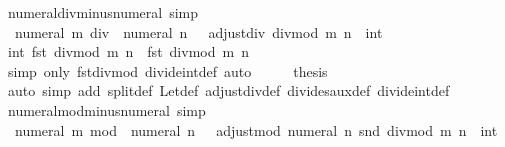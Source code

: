 \begin{isabellebody}
\isamarkupfalse%
%
\endisatagproof
{\isafoldproof}%
%
\isadelimproof
\isanewline
%
\endisadelimproof
\isanewline
{}\isamarkupfalse%
\ numeral{\isacharunderscore}{\kern0pt}div{\isacharunderscore}{\kern0pt}minus{\isacharunderscore}{\kern0pt}numeral\ {\isacharbrackleft}{\kern0pt}simp{\isacharbrackright}{\kern0pt}{\isacharcolon}{\kern0pt}\isanewline
\ \ {\isachardoublequoteopen}numeral\ m\ div\ {\isacharminus}{\kern0pt}\ numeral\ n\ {\isacharequal}{\kern0pt}\ {\isacharminus}{\kern0pt}\ {\isacharparenleft}{\kern0pt}adjust{\isacharunderscore}{\kern0pt}div\ {\isacharparenleft}{\kern0pt}divmod\ m\ n{\isacharparenright}{\kern0pt}\ {\isacharcolon}{\kern0pt}{\isacharcolon}{\kern0pt}\ int{\isacharparenright}{\kern0pt}{\isachardoublequoteclose}\isanewline
%
\isadelimproof
%
\endisadelimproof
%
\isatagproof
{}\isamarkupfalse%
\ {\isacharminus}{\kern0pt}\isanewline
\ \ \isamarkupfalse%
\ {\isachardoublequoteopen}int\ {\isacharparenleft}{\kern0pt}fst\ {\isacharparenleft}{\kern0pt}divmod\ m\ n{\isacharparenright}{\kern0pt}{\isacharparenright}{\kern0pt}\ {\isacharequal}{\kern0pt}\ fst\ {\isacharparenleft}{\kern0pt}divmod\ m\ n{\isacharparenright}{\kern0pt}{\isachardoublequoteclose}\isanewline
\ \ \ \ \isamarkupfalse%
\ {\isacharparenleft}{\kern0pt}simp\ only{\isacharcolon}{\kern0pt}\ fst{\isacharunderscore}{\kern0pt}divmod\ divide{\isacharunderscore}{\kern0pt}int{\isacharunderscore}{\kern0pt}def{\isacharparenright}{\kern0pt}\ auto\isanewline
\ \ \isamarkupfalse%
\ \isamarkupfalse%
\ {\isacharquery}{\kern0pt}thesis\isanewline
\ \ \ \ \isamarkupfalse%
\ {\isacharparenleft}{\kern0pt}auto\ simp\ add{\isacharcolon}{\kern0pt}\ split{\isacharunderscore}{\kern0pt}def\ Let{\isacharunderscore}{\kern0pt}def\ adjust{\isacharunderscore}{\kern0pt}div{\isacharunderscore}{\kern0pt}def\ divides{\isacharunderscore}{\kern0pt}aux{\isacharunderscore}{\kern0pt}def\ divide{\isacharunderscore}{\kern0pt}int{\isacharunderscore}{\kern0pt}def{\isacharparenright}{\kern0pt}\isanewline
{}\isamarkupfalse%
%
\endisatagproof
{\isafoldproof}%
%
\isadelimproof
\isanewline
%
\endisadelimproof
\ \ \isanewline
{}\isamarkupfalse%
\ numeral{\isacharunderscore}{\kern0pt}mod{\isacharunderscore}{\kern0pt}minus{\isacharunderscore}{\kern0pt}numeral\ {\isacharbrackleft}{\kern0pt}simp{\isacharbrackright}{\kern0pt}{\isacharcolon}{\kern0pt}\isanewline
\ \ {\isachardoublequoteopen}numeral\ m\ mod\ {\isacharminus}{\kern0pt}\ numeral\ n\ {\isacharequal}{\kern0pt}\ {\isacharminus}{\kern0pt}\ adjust{\isacharunderscore}{\kern0pt}mod\ {\isacharparenleft}{\kern0pt}numeral\ n{\isacharparenright}{\kern0pt}\ {\isacharparenleft}{\kern0pt}snd\ {\isacharparenleft}{\kern0pt}divmod\ m\ n{\isacharparenright}{\kern0pt}\ {\isacharcolon}{\kern0pt}{\isacharcolon}{\kern0pt}\ int{\isacharparenright}{\kern0pt}{\isachardoublequoteclose}\isanewline

\end{isabellebody}
